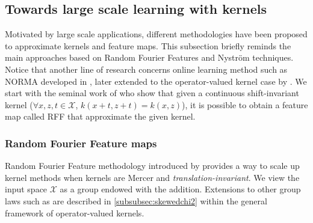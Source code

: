 \subsection{Towards large scale learning with kernels}
Motivated by large scale applications, different methodologies have been
proposed to approximate kernels and feature maps. This subsection briefly
reminds the main approaches based on  Random Fourier Features and Nystr\"om
techniques. Notice that another line of research concerns online learning
method such as \acs{NORMA} developed in \cite{kivinen2004online}, later
extended to the operator-valued kernel case by \cite{audiffren2013online}.  We
start with the seminal work of \citet{Rahimi2007} who show that given a
continuous shift-invariant kernel ($\forall x, z, t \in \mathcal{X}$, $k(x + t,
z + t) = k(x, z)$), it is possible to obtain a feature map called \acs{RFF}
that approximate the given kernel.
\subsubsection{Random Fourier Feature maps}
Random Fourier Feature methodology introduced  by \citet{Rahimi2007} provides a
way to scale up kernel methods when kernels are Mercer and
\emph{translation-invariant}.  We view the input space $\mathcal{X}$ as a group
endowed with the addition. Extensions to other group laws such as
\citet{li2010random} are described in \cref{subsubsec:skewedchi2} within the
general framework of operator-valued kernels.
